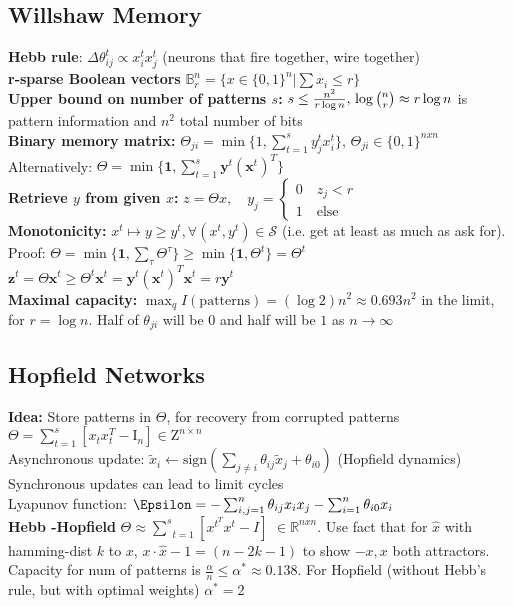 \subsection*{Willshaw Memory}
\textbf{Hebb rule}: $\Delta\theta_{ij}^t\propto x_i^tx_j^t$ (neurons that fire together, wire together)\\
\textbf{r-sparse Boolean vectors} $\mathbb{B}_r^n=\{x\in\{0,1\}^n|\sum x_i \leq r\}$\\
\textbf{Upper bound on number of patterns $s$:} $s\leq\frac{n^2}{r\log n}, \\ \log {n\choose r}\approx r\log n$ is pattern information and $n^2$ total number of bits\\
\textbf{Binary memory matrix:} $\Theta_{ji} = \min\{1,\sum_{t=1}^sy_j^tx_i^t\}$, $\Theta_{ji} \in \{0,1\}^{nxn}$ \\ Alternatively: $\Theta=\min\{\mathbf 1,\sum_{t=1}^s\mathbf y^t(\mathbf x^t)^T\}$\\
\textbf{Retrieve $y$ from given $x$:} $z=\Theta x, \quad y_j=\begin{cases} 0 \quad z_j<r \\ 1 \quad \text{else} \end{cases}$\\
\textbf{Monotonicity:} $x^t\mapsto y\geq y^t, \forall (x^t,y^t)\in\mathcal S$ (i.e. get at least as much as ask for). Proof: $\Theta=\min\{\mathbf 1,\sum_{\tau}\Theta^\tau\}\geq\min\{\mathbf 1,\Theta^t\}=\Theta^t$\\
$\mathbf z^t=\Theta \mathbf x^t\geq\Theta^t \mathbf x^t=\mathbf y^t(\mathbf x^t)^T\mathbf x^t=r\mathbf y^t$\\
\textbf{Maximal capacity:} $\max_qI(\text{patterns})=(\log 2)n^2\approx 0.693n^2$ in the limit, for $r=\log n$. Half of $\theta_{ji}$ will be $0$ and half will be $1$ as $n\rightarrow\infty$
\subsection*{Hopfield Networks}
\textbf{Idea:} Store patterns in $\Theta$, for recovery from corrupted patterns\\
$\Theta=\sum_{t=1}^s[x_tx_t^T-\mathrm I_n]\in\mathrm Z^{n\times n}$\\
Asynchronous update: $\tilde x_i\leftarrow \text{sign}(\sum_{j\neq i}\theta_{ij}\tilde x_j+\theta_{i0})$  (Hopfield dynamics)\\
Synchronous updates can lead to limit cycles\\
Lyapunov function: $\Epsilon=-\sum_{i,j=1}^n\theta_{ij}x_ix_j-\sum_{i=1}^n\theta_{i0}x_i$\\
\textbf{Hebb -Hopfield} $\Theta \approx \underset{t=1}{\overset{s}{\sum}}[x^{t}^Tx^t-I]$ $\in \mathbb{R}^{nxn}$. Use fact that for $\hat{x}$ with hamming-dist $k$ to $x$, $x\cdot\hat{x}-1 = (n-2k-1)$ to show $-x,x$ both attractors. Capacity for num of patterns is $\frac{\alpha}{n} \leq \alpha^* \approx 0.138$. For Hopfield (without Hebb's rule, but with optimal weights) $\alpha^* = 2$